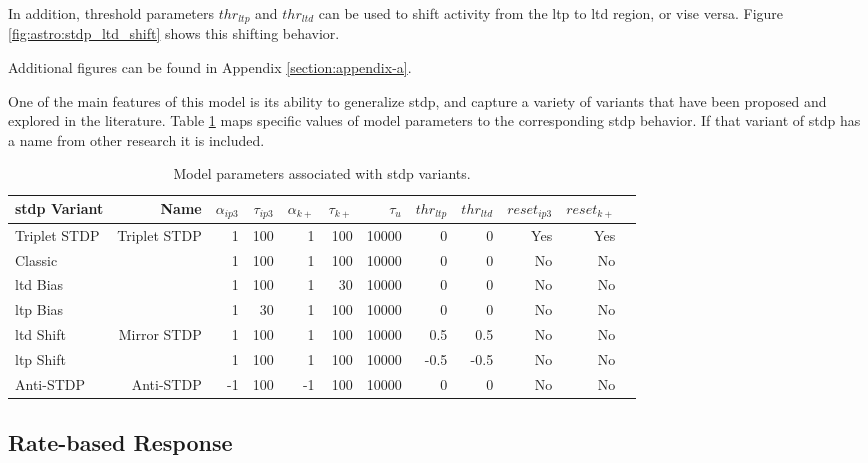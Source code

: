 
In addition, threshold parameters $thr_{ltp}$ and $thr_{ltd}$ can be used to
shift activity from the \gls{ltp} to \gls{ltd} region, or vise versa. Figure
\ref{fig:astro:stdp_ltd_shift} shows this shifting behavior.


Additional figures can be found in Appendix \ref{section:appendix-a}.

One of the main features of this model is its ability to generalize \gls{stdp},
and capture a variety of variants that have been proposed and explored in the
literature. Table \ref{table:astro_varient_params} maps specific values of
model parameters to the corresponding \gls{stdp} behavior. If that
variant of \gls{stdp} has a name from other research it is included.

\begin{table}[!htp]\centering
\caption{Model parameters associated with \gls{stdp} variants.} \label{table:astro_varient_params}
\scriptsize
\begin{tabular}{lrrrrrrrrrrr}\toprule
\gls{stdp} Variant &Name &$\alpha_{ip3}$ &$\tau_{ip3}$ &$\alpha_{k+}$ &$\tau_{k+}$ &$\tau_u$ &$thr_{ltp}$ &$thr_{ltd}$ &$reset_{ip3}$ &$reset_{k+}$ \\\midrule
Triplet STDP &Triplet STDP &1 &100 &1 &100 &10000 &0 &0 &Yes &Yes \\
Classic & &1 &100 &1 &100 &10000 &0 &0 &No &No \\
\Gls{ltd} Bias & &1 &100 &1 &30 &10000 &0 &0 &No &No \\
\Gls{ltp} Bias & &1 &30 &1 &100 &10000 &0 &0 &No &No \\
\Gls{ltd} Shift &Mirror STDP &1 &100 &1 &100 &10000 &0.5 &0.5 &No &No \\
\Gls{ltp} Shift & &1 &100 &1 &100 &10000 &-0.5 &-0.5 &No &No \\
Anti-STDP &Anti-STDP &-1 &100 &-1 &100 &10000 &0 &0 &No &No \\
\bottomrule
\end{tabular}
\end{table}

\subsection{Rate-based Response} \label{sec:rate_response}

